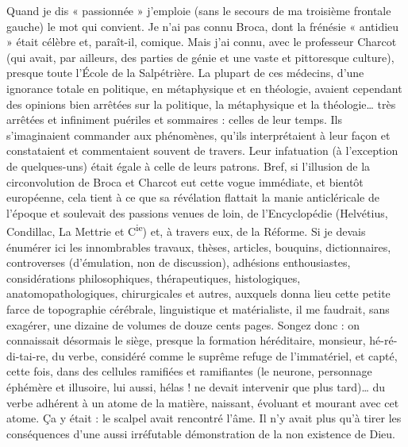 \documentclass[french,twoside]{book} %
\begin{document}
Quand je dis « passionnée » j’emploie (sans le secours de ma troisième frontale gauche) le mot qui convient. Je n’ai pas connu Broca, dont la frénésie « antidieu » était célèbre et, paraît-il, comique. Mais j’ai connu, avec le professeur Charcot (qui avait, par ailleurs, des parties de génie et une vaste et pittoresque culture), presque toute l’École de la Salpétrière. La plupart de ces médecins, d’une ignorance totale en politique, en métaphysique et en théologie, avaient cependant des opinions bien arrêtées sur la politique, la métaphysique et la théologie… très arrêtées et infiniment puériles et sommaires : celles de leur temps. Ils s’imaginaient commander aux phénomènes, qu’ils interprétaient à leur façon et constataient et commentaient souvent de travers. Leur infatuation (à l’exception de quelques-uns) était égale à celle de leurs patrons. Bref, si l’illusion de la circonvolution de Broca et Charcot eut cette vogue immédiate, et bientôt européenne, cela tient à ce que sa révélation flattait la manie anticléricale de l’époque et soulevait des passions venues de loin, de l’Encyclopédie (Helvétius, Condillac, La Mettrie et C\textsuperscript{ie}) et, à travers eux, de la Réforme. Si je devais énumérer ici les innombrables travaux, thèses, articles, bouquins, dictionnaires, controverses (d’émulation, non de discussion), adhésions enthousiastes, considérations philosophiques, thérapeutiques, histologiques, anatomopathologiques, chirurgicales et autres, auxquels donna lieu cette petite farce de topographie cérébrale, linguistique et matérialiste, il me faudrait, sans exagérer, une dizaine de volumes de douze cents pages. Songez donc : on connaissait désormais le siège, presque la formation héréditaire, monsieur, hé-ré-di-tai-re, du verbe, considéré comme le suprême refuge de l’immatériel, et capté, cette fois, dans des cellules ramifiées et ramifiantes (le neurone, personnage éphémère et illusoire, lui aussi, hélas ! ne devait intervenir que plus tard)… du verbe adhérent à un atome de la matière, naissant, évoluant et mourant avec cet atome. Ça y était : le scalpel avait rencontré l’âme. Il n’y avait plus qu’à tirer les conséquences d’une aussi irréfutable démonstration de la non existence de Dieu.\par
\end{document}
